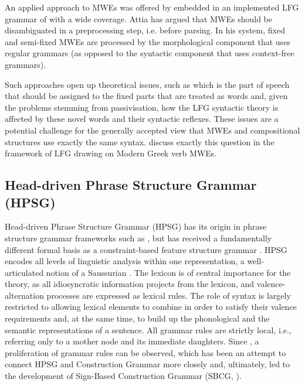 \documentclass[output=paper]{langsci/langscibook}
\begin{document}
An applied approach to MWEs was offered by \cite{attia2006}   embedded in an implemented LFG grammar of  with a wide coverage. Attia has argued that MWEs should be disambiguated in a preprocessing step, i.e. before parsing. In his system, fixed and semi-fixed MWEs are processed by the morphological component that uses regular grammars (as opposed to the syntactic component that uses context-free grammars). 

Such approaches open up theoretical issues, such as which is the part of speech that should be assigned to the fixed parts that are treated as words and, given the problems stemming from passivisation,  how the LFG syntactic theory is affected by these novel words and their syntactic reflexes.  These issues are a potential challenge for the generally accepted view that MWEs and compositional structures use exactly the same syntax.  
discuss exactly this question in the framework of LFG drawing on Modern Greek verb MWEs.  


\subsection{Head-driven Phrase Structure Grammar (HPSG)}
\label{Sec-HPSG}


Head-driven Phrase Structure Grammar (HPSG) has its origin in phrase structure grammar frameworks such as  \citep{GKPS}, but has received a fundamentally different formal basis as a constraint-based feature structure grammar \citep{pollard:98,Richter:04}. 
HPSG encodes all levels of linguistic analysis within one representation, a well-articula\-ted notion of a  Saussurian . 
The lexicon is of central importance for the theory, as all idiosyncratic information projects from the lexicon, and valence-alternation processes are expressed as lexical rules. 
The role of syntax is largely restricted to allowing lexical elements to combine in order to satisfy their valence requirements and, at the same time, to build up the phonological and the semantic representations of a sentence. 
All grammar rules are strictly local, i.e., referring only to a mother node and its immediate daughters. Since \citet{Sag:97}, a proliferation of grammar rules can be observed, which has been an attempt to connect HPSG and Construction Grammar more closely and, ultimately, led to the development of Sign-Based Construction Grammar (SBCG, \citealt{Sag:12}).
 
\end{document}
